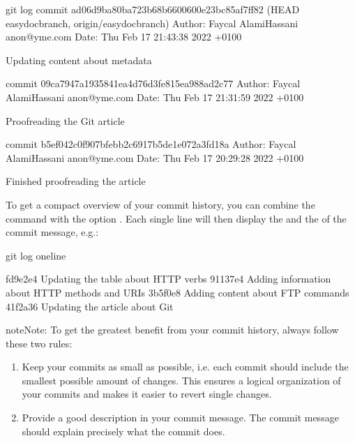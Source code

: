 \documentclass[a4paper,10pt,english,openany,oneside]{sphinxmanual}
\begin{document}
\begin{sphinxVerbatim}[commandchars=\\\{\}]
\PYGZdl{} git log
commit ad06d9ba80ba723b68b6600600e23bc85af7ff82 (HEAD \PYGZhy{}\PYGZgt{} easydocbranch, origin/easydocbranch)
Author: Faycal Alami\PYGZhy{}Hassani \PYGZlt{}anon@yme.com\PYGZgt{}
Date:   Thu Feb 17 21:43:38 2022 +0100

Updating content about metadata

commit 09ca7947a1935841ea4d76d3fe815ea988ad2c77
Author: Faycal Alami\PYGZhy{}Hassani \PYGZlt{}anon@yme.com\PYGZgt{}
Date:   Thu Feb 17 21:31:59 2022 +0100

Proofreading the Git article

commit b5ef042c0f907bfebb2c6917b5de1e072a3fd18a
Author: Faycal Alami\PYGZhy{}Hassani \PYGZlt{}anon@yme.com\PYGZgt{}
Date:   Thu Feb 17 20:29:28 2022 +0100

Finished proofreading the article
\end{sphinxVerbatim}

\sphinxAtStartPar
To get a compact overview of your commit history, you can combine the  command with the option . Each single line will then display the  and the  of the commit message, e.g.:

\begin{sphinxVerbatim}[commandchars=\\\{\}]
\PYGZdl{} git log \PYGZhy{}\PYGZhy{}oneline

fd9e2e4 Updating the table about HTTP verbs
91137e4 Adding information about HTTP methods and URIs
3b5f0e8 Adding content about FTP commands
41f2a36 Updating the article about Git
\end{sphinxVerbatim}

\begin{sphinxadmonition}{note}{Note:}
\sphinxAtStartPar
To get the greatest benefit from your commit history, always follow these two rules:
\begin{enumerate}
%
\item {} 
\sphinxAtStartPar
Keep your commits as small as possible, i.e. each commit should include the smallest possible amount of changes. This ensures a logical organization of your commits and makes it easier to revert single changes.

\item {} 
\sphinxAtStartPar
Provide a good description in your commit message. The commit message should explain precisely what the commit does.

\end{enumerate}
\end{sphinxadmonition}
\end{document}
